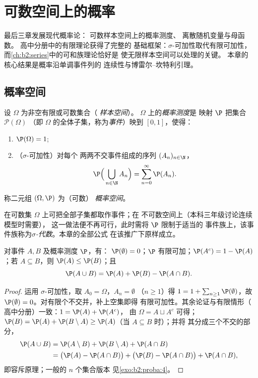 \chapter{可数空间上的概率}\label{ch:b2:proba}

最后三章发展现代概率论：
可数样本空间上的概率测度、
离散随机变量与母函数。
高中分册中的有限理论获得了完整的
基础框架：$\sigma$-可加性取代有限可加性，
而\cref{ch:b2:series}中的可和族理论恰好是
使无限样本空间可以处理的关键。
本章的核心结果是概率沿单调事件列的
连续性与博雷尔--坎特利引理。

\section{概率空间}

\begin{definition}[可数概率空间]\label{def:b2:proba:space}
设 $\Omega$ 为非空有限或可数集合（
\emph{样本空间}）。
$\Omega$ 上的\emph{概率测度}是
映射 $\P$ 把集合 $\mathcal{P}(\Omega)$
（即 $\Omega$ 的全体子集，称为\emph{事件}）映到 $[0, 1]$，使得：
\begin{enumerate}
\item $\P(\Omega) = 1$;
\item （$\sigma$-可加性）对每个
两两不交事件组成的序列 $(A_n)_{n\in\N}$，
\[
\P\Bigl(\,\bigcup_{n \in \N} A_n\Bigr)
= \sum_{n=0}^{\infty} \P(A_n) .
\]
\end{enumerate}
称二元组 $(\Omega, \P)$ 为（可数）
\emph{概率空间}。
\end{definition}

\begin{remark}
在可数集 $\Omega$ 上可把全部子集都取作事件；在
不可数空间上（本科三年级讨论连续模型时需要），
这一做法便不再可行，此时需将 $\P$ 限制于适当的
事件族上，该事件族称为\emph{$\sigma$-代数}。本章的全部公式
在该推广下原样成立。
\end{remark}

\begin{proposition}[基本性质]\label{prop:b2:proba:rules}
对事件 $A, B$ 及概率测度 $\P$，有：
$\P(\emptyset) = 0$；$\P$ 有限可加；$\P(A^c) = 1 -
\P(A)$；若 $A \subseteq B$，则 $\P(A) \leq \P(B)$；且
\[
\P(A \cup B) = \P(A) + \P(B) - \P(A \cap B) .
\]
\end{proposition}

\begin{proof}
运用 $\sigma$-可加性，取 $A_0 = \Omega$，$A_n = \emptyset$
（$n \geq 1$）得 $1 = 1 + \sum_{n\geq1}\P(\emptyset)$，故
$\P(\emptyset) = 0$。对有限个不交并，补上空集即得
有限可加性。其余论证与有限情形（
高中分册）一致：$1 = \P(A) + \P(A^c)$，
由 $\Omega = A \sqcup A^c$ 可得；$\P(B) = \P(A) + \P(B \setminus A)
\geq \P(A)$（当 $A \subseteq B$ 时）；并将
其分成三个不交的部分，
\begin{align*}
\P(A \cup B) &= \P(A \setminus B) + \P(B \setminus A) +
\P(A \cap B)\\
&= \bigl(\P(A) - \P(A\cap B)\bigr) + \bigl(\P(B) - \P(A\cap
B)\bigr) + \P(A \cap B),
\end{align*}
即容斥原理；一般的 $n$ 个集合版本
见\cref{exo:b2:proba:4}。
\end{proof}

